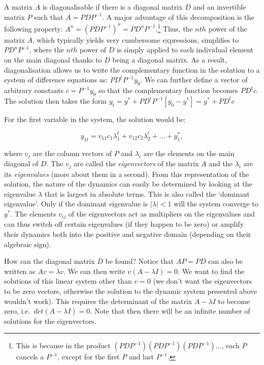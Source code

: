\documentclass[
  letterpaper,
  DIV=11,
  numbers=noendperiod]{scrreprt}
\begin{document}
A matrix \(A\) is diagonalisable if there is a diagonal matrix \(D\) and
an invertible matrix \(P\) such that \(A=PDP^{-1}\). A major advantage
of this decomposition is the following property:
\(A^n = (PDP^{-1})^n = PD^nP^{-1}\).\footnote{This is because in the
  product \((PDP^{-1})(PDP^{-1})(PDP^{-1})...\), each \(P\) cancels a
  \(P^{-1}\), except for the first \(P\) and last \(P^{-1}\).} Thus, the
\(nth\) power of the matrix \(A\), which typically yields very
cumbersome expressions, simplifies to \(PD^nP^{-1}\), where the \(nth\)
power of \(D\) is simply applied to each individual element on the main
diagonal thanks to \(D\) being a diagonal matrix. As a result,
diagonalisation allows us to write the complementary function in the
solution to a system of difference equations as: \(PD^tP^{-1}y_0\). We
can further define a vector of arbitrary constants \(c=P^{-1}y_0\) so
that the complementary function becomes \(PD^tc\). The solution then
takes the form \(y_t = y^* + PD^tP^{-1}[y_0- y^*] = y^* + PD^tc\)

For the first variable in the system, the solution would be:

\[
y_{1t}=v_{11}c_1\lambda_1^t+v_{12}c_2\lambda_2^t + ...+ y_1^*,
\]

where \(v_j\) are the column vectors of \(P\) and \(\lambda_i\) are the
elements on the main diagonal of \(D\). The \(v_j\) are called the
\emph{eigenvectors} of the matrix \(A\) and the \(\lambda_i\) are its
\emph{eigenvalues} (more about them in a second). From this
representation of the solution, the nature of the dynamics can easily be
determined by looking at the eigenvalue \(\lambda\) that is largest in
absolute terms. This is also called the `dominant eigenvalue'. Only if
the dominant eigenvalue is \(|\lambda|<1\) will the system converge to
\(y^*\). The elements \(v_{ij}\) of the eigenvectors act as multipliers
on the eigenvalues and can thus switch off certain eigenvalues (if they
happen to be zero) or amplify their dynamics both into the positive and
negative domain (depending on their algebraic sign).

How can the diagonal matrix \(D\) be found? Notice that \(AP=PD\) can
also be written as \(Av=\lambda v\). We can then write
\(v(A-\lambda I)=0\). We want to find the solutions of this linear
system other than \(v = 0\) (we don't want the eigenvectors to be zero
vectors, otherwise the solution to the dynamic system presented above
wouldn't work). This requires the determinant of the matrix
\(A-\lambda I\) to become zero, i.e.~\(det(A-\lambda I)=0\). Note that
then there will be an infinite number of solutions for the eigenvectors.
\end{document}

